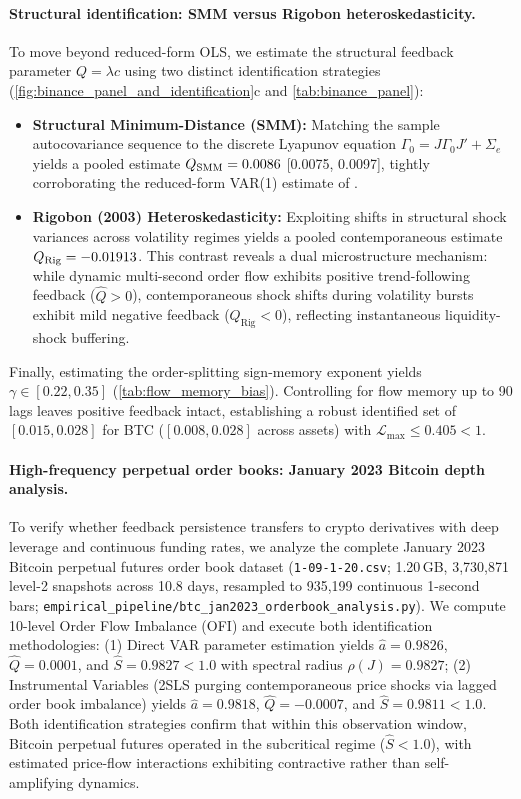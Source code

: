 \documentclass[10pt,twocolumn,letterpaper]{article}
\theoremstyle{definition}
\theoremstyle{remark}
\begin{document}
\paragraph{Structural identification: SMM versus Rigobon heteroskedasticity.} To move beyond reduced-form OLS, we estimate the structural feedback parameter $Q = \lambda c$ using two distinct identification strategies (\cref{fig:binance_panel_and_identification}c and \cref{tab:binance_panel}):
\begin{itemize}
 \item \textbf{Structural Minimum-Distance (SMM):} Matching the sample autocovariance sequence to the discrete Lyapunov equation $\Gamma_0 = J \Gamma_0 J' + \Sigma_e$ yields a pooled estimate $Q_{\text{SMM}} = 0.0086$ [0.0075, 0.0097], tightly corroborating the reduced-form VAR(1) estimate of \PanelQPooled.
 \item \textbf{Rigobon (2003) Heteroskedasticity:} Exploiting shifts in structural shock variances across volatility regimes yields a pooled contemporaneous estimate $Q_{\text{Rig}} = -0.01913$. This contrast reveals a dual microstructure mechanism: while dynamic multi-second order flow exhibits positive trend-following feedback ($\hat Q > 0$), contemporaneous shock shifts during volatility bursts exhibit mild negative feedback ($Q_{\text{Rig}} < 0$), reflecting instantaneous liquidity-shock buffering.
\end{itemize}
Finally, estimating the order-splitting sign-memory exponent yields $\gamma \in [0.22, 0.35]$ (\cref{tab:flow_memory_bias}). Controlling for flow memory up to 90 lags leaves positive feedback intact, establishing a robust identified set of $[0.015, 0.028]$ for BTC ($[0.008, 0.028]$ across assets) with $\mathcal L_{\max} \le 0.405 < 1$.

\paragraph{High-frequency perpetual order books: January 2023 Bitcoin depth analysis.} To verify whether feedback persistence transfers to crypto derivatives with deep leverage and continuous funding rates, we analyze the complete January 2023 Bitcoin perpetual futures order book dataset (\texttt{1-09-1-20.csv}; 1.20\,GB, 3,730,871 level-2 snapshots across 10.8 days, resampled to 935,199 continuous 1-second bars; \texttt{empirical\_pipeline/btc\_jan2023\_orderbook\_analysis.py}). We compute 10-level Order Flow Imbalance (OFI) and execute both identification methodologies: (1) Direct VAR parameter estimation yields $\hat a = 0.9826$, $\hat Q = 0.0001$, and $\hat S = 0.9827 < 1.0$ with spectral radius $\rho(J) = 0.9827$; (2) Instrumental Variables (2SLS purging contemporaneous price shocks via lagged order book imbalance) yields $\hat a = 0.9818$, $\hat Q = -0.0007$, and $\hat S = 0.9811 < 1.0$. Both identification strategies confirm that within this observation window, Bitcoin perpetual futures operated in the subcritical regime ($\hat S < 1.0$), with estimated price-flow interactions exhibiting contractive rather than self-amplifying dynamics.
\end{document}
